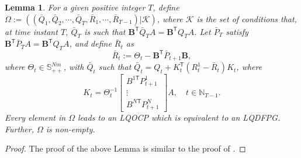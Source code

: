 \documentclass[letterpaper, 10 pt, conference]{ieeeconf}  %
\newcommand{\transpose}{\mathsf{T}}
\newtheorem{lemma}{Lemma}
\begin{document}
\begin{lemma}
    For a given positive integer $T$, define
        $\Omega := ((\bar{Q}_{1},\bar{Q}_{2},\cdots,\bar{Q}_{T},\bar{R}_{1},\cdots,\bar{R}_{T-1})|\mathcal{K})$,
    where $\mathcal{K}$ is the set of conditions that, at time instant $T$, $\bar{Q}_{T}$ is such that
            $\mathbf{B}^{\transpose}\bar{Q}_{T}A = \mathbf{B}^{\transpose}Q_{T}A$.
        Let $\bar{P}_{T}$ satisfy
            $\mathbf{B}^{\transpose}\bar{P}_{T}A = \mathbf{B}^{\transpose}Q_{T}A$, and define $\bar{R}_{t}$ as
            \begin{equation}\label{eq:matrixR}
            \bar{R}_{t} := \Theta_{t} - \mathbf{B}^{\transpose}\bar{P}_{t+1}\mathbf{B},
            \end{equation}
        where $\Theta_{t} \in \mathbb{S}_{++}^{Nm}$,
        with $\bar{Q}_{t}$ such that
            $\bar{Q}_{t} = Q_{t} + K_{t}^{\transpose}(R_{t}^{1}-\bar{R}_{t})K_{t}$,
        where
        \begin{equation*}
            K_{t} = \Theta_{t}^{-1}
            \begin{bmatrix}
                B^{1\transpose}P_{t+1}^{1}\\
                \vdots\\
                B^{N\transpose}P_{t+1}^{N}
            \end{bmatrix}
            A,\quad t\in \mathbb{N}_{T-1}.
        \end{equation*}
    Every element in $\Omega$ leads to an LQOCP which is equivalent to an LQDFPG. Further, $\Omega$ is non-empty.
\end{lemma}
\begin{proof}
    The proof of the above Lemma is similar to the proof of \cite[Theorem 7]{prasad_structure_2023}.
\end{proof}
\end{document}
